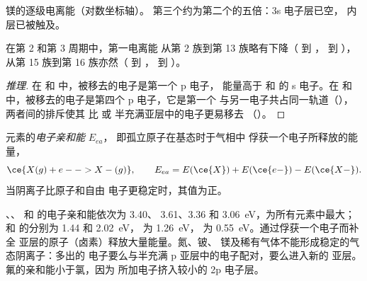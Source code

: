 \begin{omfigure}

{\small 镁的逐级电离能（对数坐标轴）。
第三个约为第二个的五倍：3s 电子层已空，
内层已被触及。}
\end{omfigure}

\begin{proposition}[同一周期中的两个低谷]\label{prop:b1:periodicity:ie-anomalies}
在第 2 和第 3 周期中，第一电离能
从第 2 族到第 13 族略有下降（ 到 ， 到 ），
从第 15 族到第 16 族亦然（ 到 ， 到 ）。
\end{proposition}

\begin{proof}[推理]
在  和  中，被移去的电子是第一个 p 电子，
能量高于  和  的 s 电子。在 
和  中，被移去的电子是第四个 p 电子，它是第一个
与另一电子共占同一轨道（），两者间的排斥使其
比  或  半充满亚层中的电子更易移去
（）。
\end{proof}

\begin{definition}[电子亲和能]\label{def:b1:periodicity:electron-affinity}
元素的\emph{电子亲和能} $E_{ea}$，
即孤立原子在基态时于气相中
俘获一个电子所释放的能量，
\[
  \ce{X(g) + e- -> X-(g)}, \qquad E_{ea} = E(\ce{X}) + E(\ce{e-}) - E(\ce{X-}) .
\]
当阴离子比原子和自由
电子更稳定时，其值为正。
\end{definition}

\begin{example}[卤素及其近邻元素]\label{ex:b1:periodicity:ea}
、、 和  的电子亲和能依次为 3.40、
3.61、3.36 和 \qty{3.06}{eV}，为所有元素中最大； 和 
的分别为 1.44 和 \qty{2.02}{eV}， 为 \qty{1.26}{eV}，
 为 \qty{0.55}{eV}。通过俘获一个电子而补全
亚层的原子（卤素）释放大量能量。氮、铍、
镁及稀有气体不能形成稳定的气态阴离子：多出的
电子要么与半充满 p 亚层中的电子配对，要么进入新的
亚层。氟的亲和能小于氯，因为
所加电子挤入较小的 2p 电子层。
\end{example}

